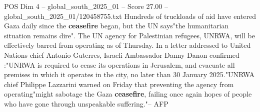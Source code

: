 \begin{textsample}{POS Dim 4 – global\_south\_2025\_01 – Score 27.00 – global\_south\_2025\_01/120458755.txt}
Hundreds of truckloads of aid have entered Gaza daily since the \textbf{ceasefire} began, but the UN says"the humanitarian situation remains dire".
The UN agency for Palestinian refugees, UNRWA, will be effectively barred from operating as of Thursday.
In a letter addressed to United Nations chief Antonio Guterres, Israeli Ambassador Danny Danon confirmed :"UNRWA is required to cease its operations in Jerusalem, and evacuate all premises in which it operates in the city, no later than 30 January 2025."UNRWA chief Philippe Lazzarini warned on Friday that preventing the agency from operating"might sabotage the Gaza \textbf{ceasefire}, failing once again hopes of people who have gone through unspeakable suffering."-- AFP

\end{textsample}
